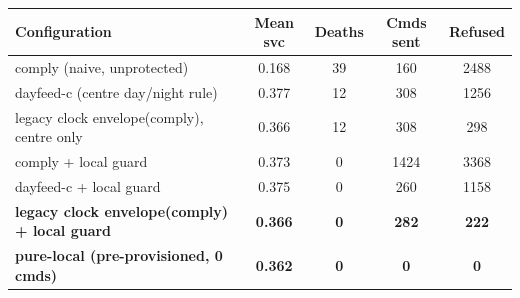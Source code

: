 \begin{tabular}{lcccc}
\toprule
Configuration & Mean svc & Deaths & Cmds sent & Refused\\
\midrule
comply (naive, unprotected) & 0.168 & 39 & 160 & 2488\\
dayfeed-c (centre day/night rule) & 0.377 & 12 & 308 & 1256\\
legacy clock envelope(comply), centre only & 0.366 & 12 & 308 & 298\\
comply + local guard & 0.373 & 0 & 1424 & 3368\\
dayfeed-c + local guard & 0.375 & 0 & 260 & 1158\\
\textbf{legacy clock envelope(comply) + local guard} & \textbf{0.366} & \textbf{0} & \textbf{282} & \textbf{222}\\
\midrule
\textbf{pure-local (pre-provisioned, 0 cmds)} & \textbf{0.362} & \textbf{0} & \textbf{0} & \textbf{0}\\
\bottomrule
\end{tabular}
